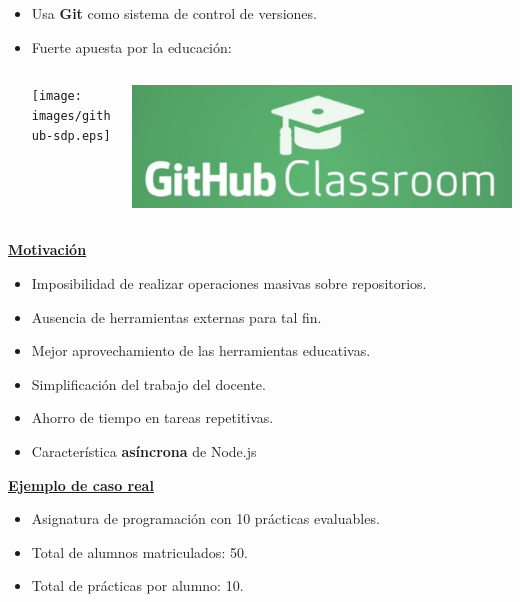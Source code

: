 \documentclass{beamer}
\begin{document}
\begin{frame}[allowframebreaks]
\begin{itemize}
       \item Usa {\bfseries Git} como sistema de control de versiones.        
	   \item Fuerte apuesta por la educación:
	   \bigskip
	   
	   	\begin{columns}
        	\begin{column}{5cm}
        		\texttt{[image: images/github-sdp.eps]}
        	\end{column}
        	\begin{column}{4cm}
          		\includegraphics[width=1.2\textwidth]{images/github-classroom.eps}
        	\end{column}
      	\end{columns}
	\end{itemize}
	\framebreak
	
	\underline{{\bfseries Motivación}} 
	\bigskip
	
	\begin{itemize}
       \item Imposibilidad de realizar operaciones masivas sobre repositorios.
	   \item Ausencia de herramientas externas para tal fin.
	   \item Mejor aprovechamiento de las herramientas educativas.
	   \item Simplificación del trabajo del docente.
	   \item Ahorro de tiempo en tareas repetitivas.
	   \item Característica {\bfseries asíncrona} de Node.js
	\end{itemize}
	\framebreak
	
	\underline{{\bfseries Ejemplo de caso real}}
	\bigskip
	
	\begin{itemize}
       \item Asignatura de programación con 10 prácticas evaluables.
	   \item Total de alumnos matriculados: 50.
	   \item Total de prácticas por alumno: 10.
	\end{itemize}
	

\end{frame}
\end{document}
